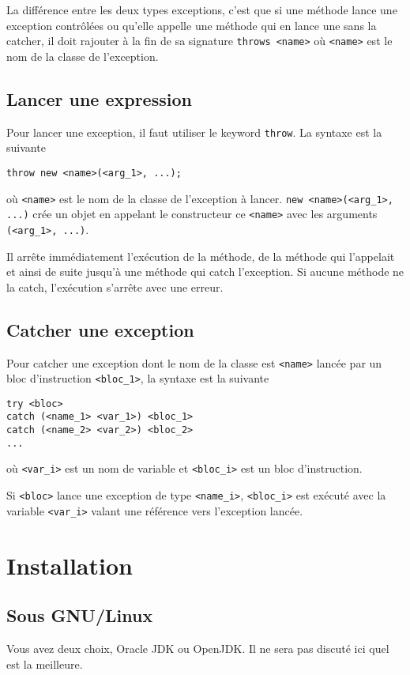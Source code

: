 La différence entre les deux types exceptions, c'est que si une méthode
lance une exception contrôlées ou qu'elle appelle une méthode qui en
lance une sans la catcher, il doit rajouter à la fin de sa signature
\lstinline|throws <name>| où \lstinline|<name>| est le nom de la classe
de l'exception.

\subsection{Lancer une expression}
Pour lancer une exception, il faut utiliser le keyword \lstinline{throw}.
La syntaxe est la suivante
\begin{lstlisting}
throw new <name>(<arg_1>, ...);
\end{lstlisting}
où \lstinline|<name>| est le nom de la classe de l'exception à lancer.
\lstinline|new <name>(<arg_1>, ...)| crée un objet en appelant le constructeur
ce \lstinline|<name>| avec les arguments \lstinline|(<arg_1>, ...)|.

Il arrête immédiatement l'exécution de la méthode, de la méthode qui
l'appelait et ainsi de suite jusqu'à une méthode qui catch l'exception.
Si aucune méthode ne la catch, l'exécution s'arrête avec une erreur.

\subsection{Catcher une exception}
Pour catcher une exception dont le nom de la classe est \lstinline|<name>|
lancée par un bloc d'instruction \lstinline|<bloc_1>|,
la syntaxe est la suivante
\begin{lstlisting}
try <bloc>
catch (<name_1> <var_1>) <bloc_1>
catch (<name_2> <var_2>) <bloc_2>
...
\end{lstlisting}
où \lstinline|<var_i>| est un nom de variable et \lstinline|<bloc_i>|
est un bloc d'instruction.

Si \lstinline|<bloc>| lance une exception de type \lstinline|<name_i>|,
\lstinline|<bloc_i>| est exécuté avec la variable \lstinline|<var_i>|
valant une référence vers l'exception lancée.

\annexe
\section{Installation}
\subsection{Sous GNU/Linux}
Vous avez deux choix, Oracle JDK ou OpenJDK.
Il ne sera pas discuté ici quel est la meilleure.


